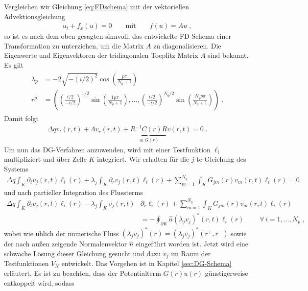 Vergleichen wir Gleichung \eqref{eq:FDschema} mit der vektoriellen Advektionsgleichung
\begin{align}
  u_t + f_x(u) = 0 \qquad \text{mit} \qquad
  f(u) = Au \; ,
\end{align}
so ist es nach dem oben gesagten sinnvoll, das entwickelte FD-Schema einer Transformation zu unterziehen, um die Matrix $A$ zu diagonalisieren. Die Eigenwerte und Eigenvektoren der tridiagonalen Toeplitz Matrix $A$ sind bekannt. Es gilt
\begin{gather}
\begin{align}
  \lambda_p &= -2\sqrt{-(i/2)^2}\cos\left(\frac{p\pi}{N_q+1}\right) \\
  r^p &= \left( \left( \frac{i/2}{-i/2} \right)^{1/2} \sin \left( \frac{1 p\pi }{N_q+1} \right), \ldots , \left( \frac{i/2}{-i/2} \right)^{N_q/2} \sin \left( \frac{N_q p \pi}{N_q+1} \right) \right) \; .
\end{align}
\end{gather}
Damit folgt
\begin{align}
  \Delta q v_t(r,t) + \Lambda v_r(r,t) + \underbrace{R^{-1}C(r)R}_{\equiv G(r)} v(r,t) = 0 \; .
  \label{eq:lvn_diagonalisiert}
\end{align}
Um nun das DG-Verfahren anzuwenden, wird mit einer Testfunktion $\ell_i$ multipliziert und über Zelle $K$ integriert. Wir erhalten für die $j$-te Gleichung des Systems
\begin{align*}
  \Delta q \int_K \partial_t v_j(r,t)\ell_i(r) + \lambda_j \int_K \partial_r v_j(r,t) \ell_i(r) +  \sum_{m=1}^{N_q} \int_K G_{jm}(r) v_m(r,t) \ell_i(r) = 0
\end{align*}
und nach partieller Integration des Flussterms
\begin{align*}
  \Delta q \int_K \partial_t v_j(r,t)\ell_i(r) - \lambda_j \int_K v_j(r,t) &\partial_r\ell_i(r) +  \sum_{m=1}^{N_q} \int_K G_{jm}(r) v_m(r,t) \ell_i(r)\\
      &= - \oint_{\partial K}  \hat{n} (\lambda_j v_j)^*(r,t)\ell_i(r) \;  \qquad \forall\, i=1,\dots,N_p \;,
      \label{eq:weakform_roh}
\end{align*}
wobei wie üblich der numerische Fluss $(\lambda_j v_j)^*(r) = (\lambda_j v_j)^*(r^+, r^-)$ sowie der nach außen zeigende Normalenvektor $\hat{n}$ eingeführt worden ist. Jetzt wird eine schwache Lösung dieser Gleichung gesucht und dazu $v_j$ im Raum der Testfunktionen $V_N$ entwickelt. Das Vorgehen ist in Kapitel \ref{sec:DG-Schema} erläutert. Es ist zu beachten, dass der Potentialterm $G(r)u(r)$ günstigerweise entkoppelt wird, sodass
